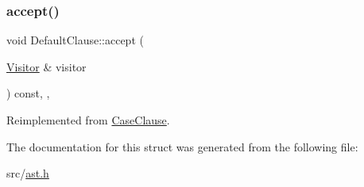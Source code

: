 \subsubsection{\texorpdfstring{accept()}{accept()}}
{\footnotesize\ttfamily void Default\+Clause\+::accept (\begin{DoxyParamCaption}\item[{\hyperlink{struct_visitor}{Visitor} \&}]{visitor }\end{DoxyParamCaption}) const\hspace{0.3cm}{\ttfamily [inline]}, {\ttfamily [override]}, {\ttfamily [virtual]}}



Reimplemented from \hyperlink{struct_case_clause_a5bbee9ea9ca206c09b8b79f8c96720a1}{Case\+Clause}.



The documentation for this struct was generated from the following file\+:\begin{DoxyCompactItemize}
\item 
src/\hyperlink{ast_8h}{ast.\+h}\end{DoxyCompactItemize}
